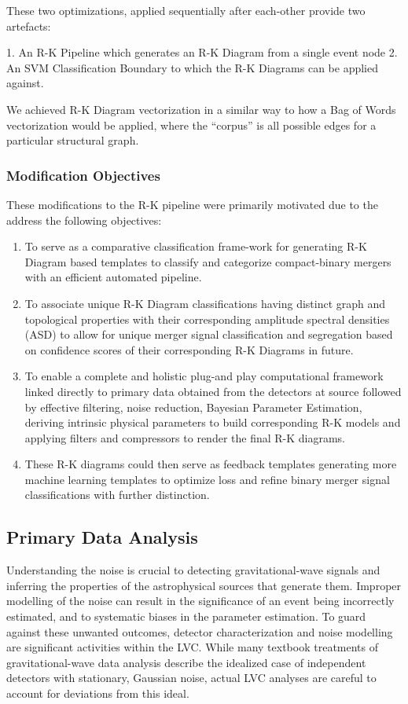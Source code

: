     These two optimizations, applied sequentially after each-other provide two artefacts:

    1. An R-K Pipeline which generates an R-K Diagram from a single event node
    2. An SVM Classification Boundary to which the R-K Diagrams can be applied against.

    We achieved R-K Diagram vectorization in a similar way to how a Bag of Words vectorization would be applied, where the ``corpus'' is all possible edges for a particular structural graph.

   \subsubsection{Modification Objectives}
    These modifications to the R-K pipeline were primarily motivated due to the address the following objectives:
    \begin{enumerate}
        \item To serve as a comparative classification frame-work for generating R-K Diagram based templates to classify and categorize compact-binary mergers with an efficient automated pipeline.
        \item To associate unique R-K Diagram classifications having distinct graph and topological properties with their  corresponding amplitude spectral densities (ASD) to allow for unique merger signal classification and segregation based on confidence scores of their corresponding R-K Diagrams in future.
        \item To enable a complete and holistic plug-and play computational framework linked directly to  primary data obtained from the detectors at source followed by effective filtering, noise reduction, Bayesian Parameter Estimation, deriving intrinsic physical parameters to build corresponding R-K models and applying filters and compressors to render the final R-K diagrams.
        \item These R-K diagrams could then serve as feedback templates generating more machine learning templates to optimize loss and refine binary merger signal classifications with further distinction.
    \end{enumerate}

    \subsection{Primary Data Analysis}

    Understanding the noise is crucial to detecting gravitational-wave signals and inferring the properties of the astrophysical sources that generate them. Improper modelling of the noise can result in the significance of an event being incorrectly estimated, and to systematic biases in the parameter estimation. To guard against these unwanted outcomes, detector characterization and noise modelling are significant activities within the LVC.\cite{00.5_GWDetectionNoiseCatalogue} While many textbook treatments of gravitational-wave data analysis describe the idealized case of independent detectors with stationary, Gaussian noise, actual LVC analyses are careful to account for deviations from this ideal.\cite{00.1_2012GWAnalysisFormalism} \cite{00.3_GravitationalWaveResearch}


